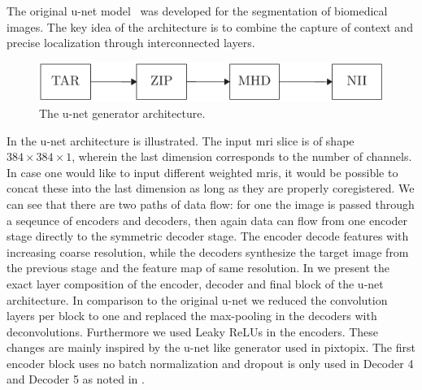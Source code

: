 The original u-net model~\cite{Ronneberger15} was developed for the
segmentation of biomedical images. The key idea of the architecture is to
combine the capture of context and precise localization through interconnected
layers.
\begin{figure}[h]
  \centering
  \includegraphics[page=3,width=.8\linewidth]{figure/diagrams.pdf}
  \caption{The u-net generator architecture.
  }\label{fig:unet:gen}
\end{figure}
In  the u-net architecture is illustrated. The
input \gls{mri} slice is of shape $384\times384\times1$, wherein the last
dimension corresponds to the number of channels. In case one would like to
input different weighted \gls{mri}s, it would be possible to concat these into
the last dimension as long as they are properly coregistered.
We can see that there are two paths of data flow: for one the image is passed
through a seqeunce of encoders and decoders, then again data can flow from
one encoder stage directly to the symmetric decoder stage. The encoder decode
features with increasing coarse resolution, while the decoders synthesize the
target image from the previous stage and the feature map of same resolution.
In  we present the exact layer composition of the
encoder, decoder and final block of the u-net architecture. In comparison to
the original u-net we reduced the convolution layers per block to one and
replaced the max-pooling in the decoders with deconvolutions. Furthermore
we used Leaky ReLUs in the encoders. These changes are mainly inspired by the
u-net like generator used in pixtopix. The first encoder block uses no batch
normalization and dropout is only used in Decoder \num{4} and Decoder \num{5}
as noted in .
